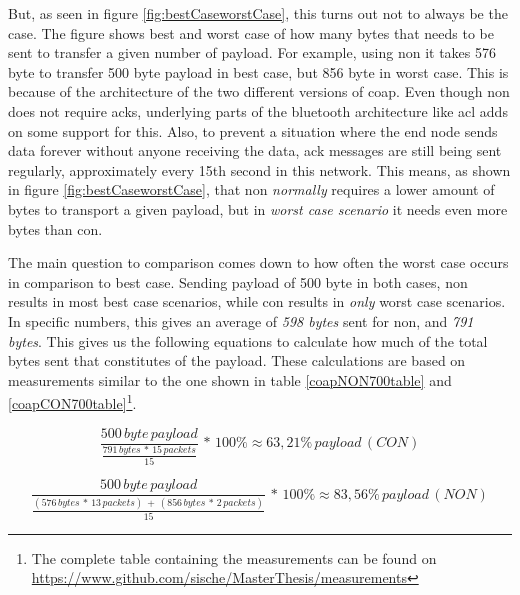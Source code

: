\noindent But, as seen in figure \ref{fig:bestCaseworstCase}, this turns out not to always be the case. The figure shows best and worst case of how many bytes that needs to be sent to transfer a given number of \gls{payload}. For example, using \gls{non} it takes 576 byte to transfer 500 byte payload in best case, but 856 byte in worst case. This is because of the architecture of the two different versions of \gls{coap}. Even though \gls{non} does not require \glspl{ack}, underlying parts of the bluetooth architecture like \gls{acl} adds on some support for this. Also, to prevent a situation where the end node sends data forever without anyone receiving the data, \gls{ack} messages are still being sent regularly, approximately every 15th second in this network. This means, as shown in figure \ref{fig:bestCaseworstCase}, that \gls{non} \textit{normally} requires a lower amount of bytes to transport a given \gls{payload}, but in \textit{worst case scenario} it needs even more bytes than \gls{con}. 






\noindent The main question to comparison comes down to how often the worst case occurs in comparison to best case. Sending payload of 500 byte in both cases, \gls{non} results in most best case scenarios, while \gls{con} results in \textit{only} worst case scenarios. In specific numbers, this gives an average of \textit{598 bytes} sent for \gls{non}, and \textit{791 bytes}. This gives us the following equations to calculate how much of the total bytes sent that constitutes of the \gls{payload}. These calculations are based on measurements similar to the one shown in table \ref{coapNON700table} and \ref{coapCON700table}\footnote{The complete table containing the measurements can be found on \url{https://www.github.com/sische/MasterThesis/measurements}}. 



\begin{equation} \label{bestWorstEquation}
	\frac{500 \, byte \, payload}{\frac{791 \, bytes \,*\, 15 \, packets}{15}}\,*\,100 \% \approx 63,21 \%\, payload \, (CON)
\end{equation}

\begin{equation} \label{bestWorstEquation2}
\frac{500\, byte\, payload}{\frac{(576\, bytes\, *\, 13\, packets)\,+\,(856\, bytes\, *\, 2 \,packets)}{15}}\,*\,100 \% \approx 83,56 \%\, payload \, (NON)
\end{equation}

